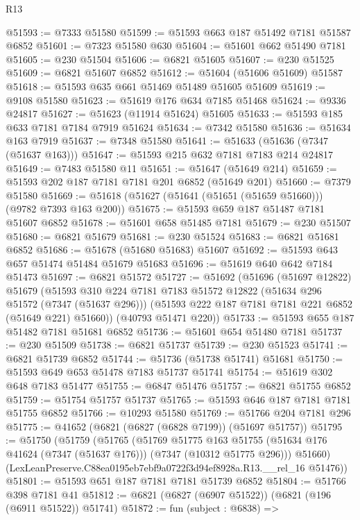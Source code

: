 \begin{lexlean}{R13}
\begin{coremodule}
@51593 := @7333 @51580
@51599 := @51593 @663 @187 @51492 @7181 @51587 @6852
@51601 := @7323 @51580 @630
@51604 := @51601 @662 @51490 @7181
@51605 := @230 @51504
@51606 := @6821 @51605
@51607 := @230 @51525
@51609 := @6821 @51607 @6852
@51612 := @51604 (@51606 @51609) @51587
@51618 := @51593 @635 @661 @51469 @51489 @51605 @51609
@51619 := @9108 @51580
@51623 := @51619 @176 @634 @7185 @51468
@51624 := @9336 @24817
@51627 := @51623 (@11914 @51624) @51605
@51633 := @51593 @185 @633 @7181 @7184 @7919 @51624
@51634 := @7342 @51580
@51636 := @51634 @163 @7919
@51637 := @7348 @51580
@51641 := @51633 (@51636 (@7347 (@51637 @163)))
@51647 := @51593 @215 @632 @7181 @7183 @214 @24817
@51649 := @7483 @51580 @11
@51651 := @51647 (@51649 @214)
@51659 := @51593 @202 @187 @7181 @7181 @201 @6852 (@51649 @201)
@51660 := @7379 @51580
@51669 := @51618 (@51627 (@51641 (@51651 (@51659 @51660))) (@9782 @7393 @163 @200))
@51675 := @51593 @659 @187 @51487 @7181 @51607 @6852
@51678 := @51601 @658 @51485 @7181
@51679 := @230 @51507
@51680 := @6821 @51679
@51681 := @230 @51524
@51683 := @6821 @51681 @6852
@51686 := @51678 (@51680 @51683) @51607
@51692 := @51593 @643 @657 @51474 @51484 @51679 @51683
@51696 := @51619 @640 @642 @7184 @51473
@51697 := @6821 @51572
@51727 := @51692
    (@51696
      (@51697 @12822)
      @51679
      (@51593
        @310
        @224
        @7181
        @7183
        @51572
        @12822
        (@51634 @296 @51572 (@7347 (@51637 @296)))
        (@51593 @222 @187 @7181 @7181 @221 @6852 (@51649 @221) @51660))
      (@40793 @51471 @220))
@51733 := @51593 @655 @187 @51482 @7181 @51681 @6852
@51736 := @51601 @654 @51480 @7181
@51737 := @230 @51509
@51738 := @6821 @51737
@51739 := @230 @51523
@51741 := @6821 @51739 @6852
@51744 := @51736 (@51738 @51741) @51681
@51750 := @51593 @649 @653 @51478 @7183 @51737 @51741
@51754 := @51619 @302 @648 @7183 @51477
@51755 := @6847 @51476
@51757 := @6821 @51755 @6852
@51759 := @51754 @51757 @51737
@51765 := @51593 @646 @187 @7181 @7181 @51755 @6852
@51766 := @10293 @51580
@51769 := @51766 @204 @7181 @296
@51775 := @41652 (@6821 (@6827 (@6828 @7199)) (@51697 @51757))
@51795 := @51750
    (@51759
      (@51765
        (@51769
          @51775
          @163
          @51755
          (@51634 @176 @41624 (@7347 (@51637 @176)))
          (@7347 (@10312 @51775 @296)))
        @51660)
      (LexLeanPreserve.C88ea0195eb7ebf9a0722f3d94ef8928a.R13.__rel_16 @51476))
@51801 := @51593 @651 @187 @7181 @7181 @51739 @6852
@51804 := @51766 @398 @7181 @41
@51812 := @6821 (@6827 (@6907 @51522)) (@6821 (@196 (@6911 @51522)) @51741)
@51872 := fun (subject : @6838) =>

\end{coremodule}
\end{lexlean}
